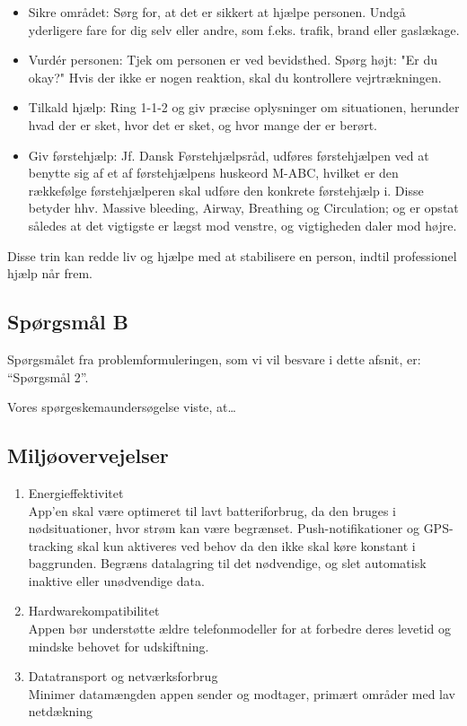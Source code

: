 \begin{enumerate}
    \begin{itemize}
        \item Sikre området:
        Sørg for, at det er sikkert at hjælpe personen. Undgå yderligere fare for dig selv eller andre, som f.eks. trafik, brand eller gaslækage.

        \item Vurdér personen:
        Tjek om personen er ved bevidsthed. Spørg højt: "Er du okay?" Hvis der ikke er nogen reaktion, skal du kontrollere vejrtrækningen.

        \item Tilkald hjælp:
        Ring 1-1-2 og giv præcise oplysninger om situationen, herunder hvad der er sket, hvor det er sket, og hvor mange der er berørt.

        \item Giv førstehjælp:
        Jf. Dansk Førstehjælpsråd, udføres førstehjælpen ved at benytte sig af et af førstehjælpens huskeord M-ABC, hvilket er den rækkefølge førstehjælperen skal udføre den konkrete førstehjælp i. Disse betyder hhv. Massive bleeding, Airway, Breathing og Circulation; og er opstat således at det vigtigste er lægst mod venstre, og vigtigheden daler mod højre.
    \end{itemize}

    Disse trin kan redde liv og hjælpe med at stabilisere en person, indtil professionel hjælp når frem.


\end{enumerate}
\subsection{Spørgsmål B}
Spørgsmålet fra problemformuleringen, som vi vil besvare i dette afsnit, er: ``Spørgsmål 2''.

Vores spørgeskemaundersøgelse viste, at\ldots


\subsection{Miljøovervejelser}

\begin{enumerate}
    \item Energieffektivitet \\
    App'en skal være optimeret til lavt batteriforbrug, da den bruges i nødsituationer, hvor strøm kan være begrænset.
    Push-notifikationer og GPS-tracking skal kun aktiveres ved behov da den ikke skal  køre konstant i baggrunden.
    Begræns datalagring til det nødvendige, og slet automatisk inaktive eller unødvendige data.

    \item Hardwarekompatibilitet \\
    Appen bør understøtte ældre telefonmodeller for at forbedre deres levetid og mindske behovet for udskiftning.

    \item Datatransport og netværksforbrug \\
    Minimer datamængden appen sender og modtager, primært områder med lav netdækning
\end{enumerate}

